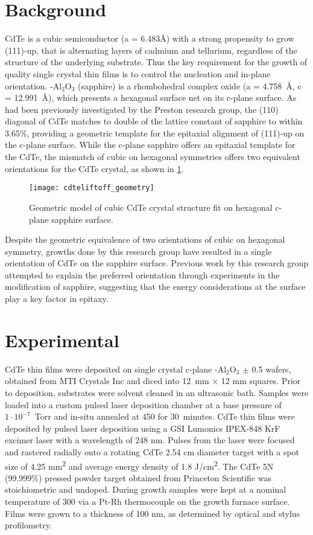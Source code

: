 \section{Background}
CdTe is a cubic semiconductor (a = 6.483\AA{}) with a strong propensity to grow (111)-up, that is alternating layers of cadmium and tellurium, regardless of the structure of the underlying substrate.
Thus the key requirement for the growth of quality single crystal thin films is to control the nucleation and in-plane orientation. \textalpha-Al\(_2\)O\(_3\) (sapphire) is a rhombohedral complex oxide (a = 4.758~\AA{}, c = 12.991~\AA{}), which presents a hexagonal surface net on its c-plane surface.
As had been previously investigated by the Preston research group, the (110) diagonal of CdTe matches to double of the lattice constant of sapphire to within 3.65\%, providing a geometric template for the epitaxial alignment of (111)-up on the 
c-plane surface.
While the c-plane sapphire offers an epitaxial template for the CdTe, the mismatch of cubic on hexagonal symmetries offers two equivalent orientations for the CdTe crystal, as shown in \cref{fig:cdteliftoff_geometry}.
\begin{figure}
 \centering \texttt{[image: cdteliftoff\_geometry]}
 \caption{\label{fig:cdteliftoff_geometry}Geometric model of cubic CdTe crystal structure fit on hexagonal c-plane sapphire surface.}
\end{figure}
Despite the geometric equivalence of two orientations of cubic on hexagonal symmetry, growths done by this research group have resulted in a single orientation of CdTe on the sapphire surface.
Previous work by this research group attempted to explain the preferred orientation through experiments in the modification of sapphire\cite{Neretina2009b}, suggesting that the energy considerations at the surface play a key factor in epitaxy.
\section{Experimental}
CdTe thin films were deposited on single crystal c-plane \textalpha-Al\(_2\)O\(_3\) \(\pm\) 0.5\degree{} wafers, obtained from MTI Crystals Inc and diced into 12~mm \(\times\) 12 mm squares.
Prior to deposition, substrates were solvent cleaned in an ultrasonic bath.
Samples were loaded into a custom pulsed laser deposition chamber at a base pressure of \(1\cdot10^{-7}\)~Torr and in-situ annealed at 450\celsius{} for 30~minutes.
CdTe thin films were deposited by pulsed laser deposition using a GSI Lumonics IPEX-848 KrF excimer laser with a wavelength of 248 nm.
Pulses from the laser were focused and rastered radially onto a rotating CdTe 2.54 cm diameter target with a spot size of 4.25 mm\textsuperscript{2} and average energy density of 1.8 J/cm\textsuperscript{2}.
The CdTe 5N (99.999\%) pressed powder 
target obtained from Princeton Scientific was stoichiometric and undoped.
During growth samples were kept at a nominal temperature of 300\celsius{} via a Pt-Rh thermocouple on the growth furnace surface.
Films were grown to a thickness of 100 nm, as determined by optical and stylus profilometry.

